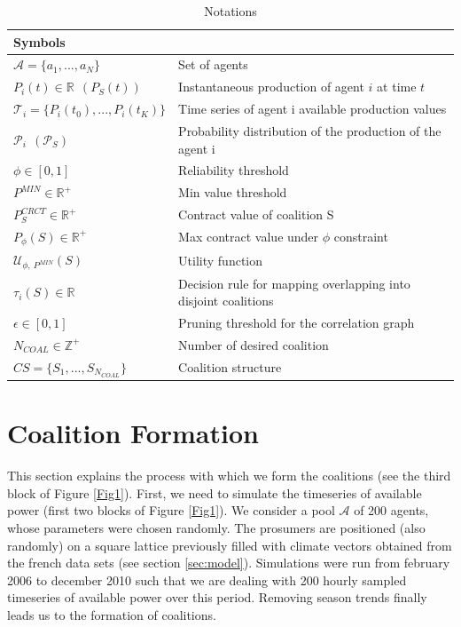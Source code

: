 \documentclass[conference]{IEEEtran}
\begin{document}
\begin{table}[!t]
\centering
\scriptsize
\begin{tabular}{l|p{4.5cm}}
  \hline
  \multicolumn{2}{l}{\textbf{Symbols}} \\
  \hline 
  $ \mathcal{A}=\{a_{1},...,a_{N}\} $ & Set of agents \\
  $ P_{i}(t) \in \mathbb{R}\ \ (P_{S}(t)) $ & Instantaneous production of agent $i$ at time $t$ \\
  $ \mathcal{T}_{i} = \{P_{i}(t_{0}),...,P_{i}(t_{K})\} $ & Time series of agent i available production values \\
  $ \mathcal{P}_{i}\ \ (\mathcal{P}_{S}) $ & Probability distribution of the production of the agent i \\
  $ \phi \in [0,1] $ & Reliability threshold \\
  $ P^{MIN} \in \mathbb{R}^+ $ & Min value threshold \\
  $ P_{S}^{CRCT} \in \mathbb{R}^+ $ & Contract value of coalition S \\
  $ P_{\phi}(S) \in \mathbb{R}^+ $ & Max contract value under $ \phi $ constraint \\
  $ \mathcal{U}_{\phi,\ P^{MIN}}(S) $ & Utility function \\
  $ \tau_{i}(S) \in \mathbb{R}$ & Decision rule for mapping overlapping into disjoint coalitions \\
  $ \epsilon \in [0,1] $ & Pruning threshold for the correlation graph \\
  $ N_{COAL} \in \mathbb{Z}^+ $ & Number of desired coalition \\
  $ CS = \{S_{1},...,S_{N_{COAL}}\} $ & Coalition structure \\
  \hline
\end{tabular}
\caption{Notations}
\label{Fig89}
\end{table}


%
%

\section{Coalition Formation}
\label{sec:forming}

This section explains the process with which we form the coalitions (see the third block of Figure \ref{Fig1}). First, we need to simulate the timeseries of available power (first two blocks of Figure \ref{Fig1}). We consider a pool $ \mathcal{A} $ of 200 agents, whose parameters were chosen randomly. The prosumers are positioned (also randomly) on a square lattice previously filled with climate vectors obtained from the french data sets (see section \ref{sec:model}). Simulations were run from february 2006 to december 2010 such that we are dealing with 200 hourly sampled timeseries of available power over this period. Removing season trends finally leads us to the formation of coalitions. 
\end{document}
